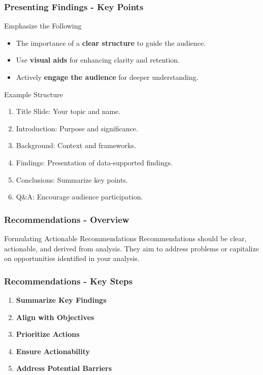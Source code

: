 \documentclass[aspectratio=169]{beamer}
\begin{document}
\begin{frame}[fragile]
    \frametitle{Presenting Findings - Key Points}
    \begin{block}{Emphasize the Following}
        \begin{itemize}
            \item The importance of a \textbf{clear structure} to guide the audience.
            \item Use \textbf{visual aids} for enhancing clarity and retention.
            \item Actively \textbf{engage the audience} for deeper understanding.
        \end{itemize}
    \end{block}

    \begin{block}{Example Structure}
        \begin{enumerate}
            \item Title Slide: Your topic and name.
            \item Introduction: Purpose and significance.
            \item Background: Context and frameworks.
            \item Findings: Presentation of data-supported findings.
            \item Conclusions: Summarize key points.
            \item Q\&A: Encourage audience participation.
        \end{enumerate}
    \end{block}
\end{frame}

\begin{frame}[fragile]
    \frametitle{Recommendations - Overview}
    \begin{block}{Formulating Actionable Recommendations}
        Recommendations should be clear, actionable, and derived from analysis. 
        They aim to address problems or capitalize on opportunities identified in your analysis.
    \end{block}
\end{frame}

\begin{frame}[fragile]
    \frametitle{Recommendations - Key Steps}
    \begin{enumerate}
        \item \textbf{Summarize Key Findings}
        \item \textbf{Align with Objectives}
        \item \textbf{Prioritize Actions}
        \item \textbf{Ensure Actionability}
        \item \textbf{Address Potential Barriers}
    \end{enumerate}
\end{frame}
\end{document}

